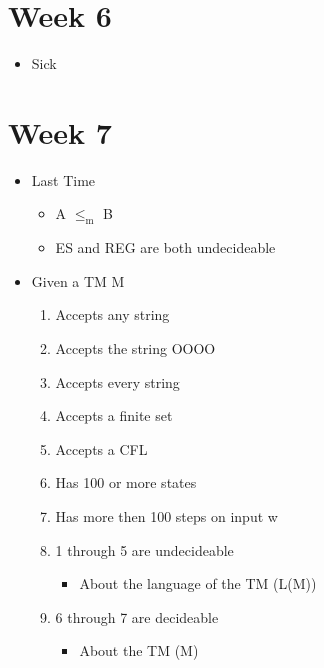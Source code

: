 \documentclass[11pt]{article}
\begin{document}
\section{Week 6}
\label{sec:org5aedea6}
\begin{itemize}
\item Sick
\end{itemize}
\section{Week 7}
\label{sec:org55a1c79}
\begin{itemize}
\item Last Time
\begin{itemize}
\item A \(\le_{\text{m}}\) B
\item ES and REG are both undecideable
\end{itemize}
\item Given a TM M
\begin{enumerate}
\item Accepts any string
\item Accepts the string OOOO
\item Accepts every string
\item Accepts a finite set
\item Accepts a CFL
\item Has 100 or more states
\item Has more then 100 steps on input w
\item 1 through 5 are undecideable
\begin{itemize}
\item About the language of the TM (L(M))
\end{itemize}
\item 6 through 7 are decideable
\begin{itemize}
\item About the TM (M)
\end{itemize}
\end{enumerate}
\end{itemize}
\end{document}
